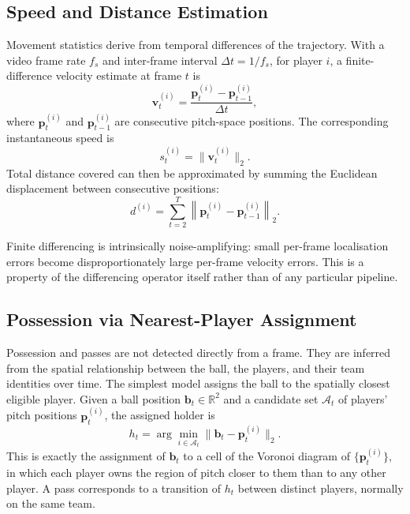 \subsection{Speed and Distance Estimation}
\label{subsec:background_speed_distance}

Movement statistics derive from temporal differences of 
the trajectory. With a video frame rate \(f_s\) and 
inter-frame interval \(\Delta t = 1/f_s\), for player \(i\), a 
finite-difference velocity estimate at frame \(t\) is
\begin{equation}
    \mathbf{v}_t^{(i)}
    = \frac{\mathbf{p}_t^{(i)} - \mathbf{p}_{t-1}^{(i)}}{\Delta t},
    \label{eq:velocity_pitch_space}
\end{equation}
where \(\mathbf{p}_t^{(i)}\) and \(\mathbf{p}_{t-1}^{(i)}\) are consecutive pitch-space positions.
The corresponding instantaneous speed is
\begin{equation}
    s_t^{(i)} = \lVert \mathbf{v}_t^{(i)} \rVert_2.
    \label{eq:instantaneous_speed}
\end{equation}
Total distance covered can then be approximated by summing the Euclidean displacement between consecutive positions:
\begin{equation}
    d^{(i)}
    =
    \sum_{t=2}^{T}
    \left\|
    \mathbf{p}_t^{(i)} - \mathbf{p}_{t-1}^{(i)}
    \right\|_2.
    \label{eq:distance_pitch_space}
\end{equation}

Finite differencing is intrinsically noise-amplifying: 
small per-frame localisation errors become 
disproportionately large per-frame velocity errors. This 
is a property of the differencing operator itself rather 
than of any particular pipeline.

\subsection{Possession via Nearest-Player Assignment}
\label{subsec:background_possession_passes}

Possession and passes are not detected directly from a 
frame. They are inferred from the spatial relationship 
between the ball, the players, and their team identities 
over time. The simplest model assigns the ball to the 
spatially closest eligible player. Given a ball position 
\(\mathbf{b}_t \in \mathbb{R}^2\) and a candidate set 
\(\mathcal{A}_t\) of players' pitch positions 
\(\mathbf{p}_t^{(i)}\), the assigned holder is
\begin{equation}
    h_t =
    \arg\min_{i \in \mathcal{A}_t}
    \lVert \mathbf{b}_t - \mathbf{p}_t^{(i)} \rVert_2.
    \label{eq:nearest_ball_holder}
\end{equation}
This is exactly the assignment of \(\mathbf{b}_t\) to a 
cell of the Voronoi diagram of \(\{\mathbf{p}_t^{(i)}\}\), 
in which each player owns the region of pitch closer to 
them than to any other player. A pass corresponds to a 
transition of \(h_t\) between distinct players, normally 
on the same team.

